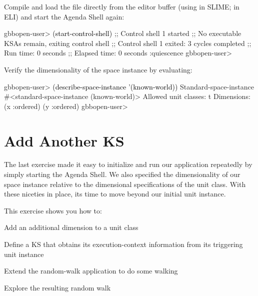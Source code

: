 \documentclass[10pt,twoside,english,pdftex]{article}
\begin{document}
Compile and load the  file directly from
the editor buffer (using  in SLIME; 
in ELI) and start the Agenda Shell again:
%
\W\supp
\begin{example}
\textcolor{darkergray}{%
  gbbopen-user> \textcolor{black}{(start-control-shell)}
  ;; Control shell 1 started
  ;; No executable KSAs remain, exiting control shell
  ;; Control shell 1 exited: 3 cycles completed
  ;; Run time: 0 seconds
  ;; Elapsed time: 0 seconds
  :quiescence
  gbbopen-user>}
\end{example}

%
Verify the dimensionality of the  space instance by
evaluating:
%
\W\supp
\begin{example}
\textcolor{darkergray}{%
  gbbopen-user> \textcolor{black}{(describe-space-instance '(known-world))}
  Standard-space-instance #<standard-space-instance (known-world)>
    Allowed unit classes: t
    Dimensions:
      (x :ordered)
      (y :ordered)
  gbbopen-user>}
\end{example}


\T\markright{}%
\T\pagestyle{plain}
\T\cleardoublepage
\W{}
\T\pagestyle{fancy}
\T\thispagestyle{fancybottom}
\T\renewcommand{\headrulewidth}{0pt}
\section{Add Another KS}
\label{sec:another-ks}%

The last exercise made it easy to initialize and run our application
repeatedly by simply starting the Agenda Shell.  We also specified the
dimensionality of our  space instance relative to the
dimensional specifications of the  unit class.  With
these niceties in place, its time to move beyond our initial
 unit instance.

\fndocrule

This exercise shows you how to:
\begin{tightitemize}
\item Add an additional dimension to a unit class
\item Define a KS that obtains its execution-context information from its
  triggering unit instance
\item Extend the random-walk application to do some walking
\item Explore the resulting random walk
\end{tightitemize}
\end{document}
